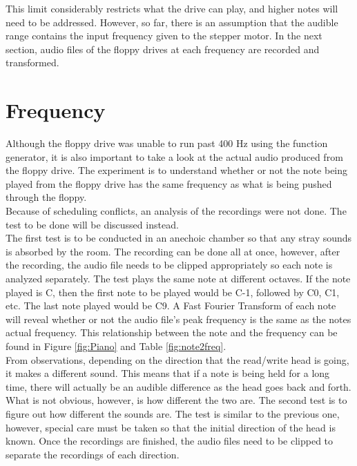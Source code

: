 \documentclass[11pt, a4paper]{report}
\begin{document}
This limit considerably restricts what the drive can play, and higher notes will need to be addressed. However, so far, there is an assumption that the audible range contains the input frequency given to the stepper motor. In the next section, audio files of the floppy drives at each frequency are recorded and transformed. \\

\section{Frequency}

Although the floppy drive was unable to run past 400 Hz using the function generator, it is also important to take a look at the actual audio produced from the floppy drive. The experiment is to understand whether or not the note being played from the floppy drive has the same frequency as what is being pushed through the floppy. \\

Because of scheduling conflicts, an analysis of the recordings were not done. The test to be done will be discussed instead. \\

The first test is to be conducted in an anechoic chamber so that any stray sounds is absorbed by the room. The recording can be done all at once, however, after the recording, the audio file needs to be clipped appropriately so each note is analyzed separately. The test plays the same note at different octaves. If the note played is C, then the first note to be played would be C-1, followed by C0, C1, etc. The last note played would be C9. A Fast Fourier Transform of each note will reveal whether or not the audio file's peak frequency is the same as the notes actual frequency. This relationship between the note and the frequency can be found in Figure \ref{fig:Piano} and Table \ref{fig:note2freq}. \\


From observations, depending on the direction that the read/write head is going, it makes a different sound. This means that if a note is being held for a long time, there will actually be an audible difference as the head goes back and forth. What is not obvious, however, is how different the two are. The second test is to figure out how different the sounds are. The test is similar to the previous one, however, special care must be taken so that the initial direction of the head is known. Once the recordings are finished, the audio files need to be clipped to separate the recordings of each direction. \\
\end{document}
